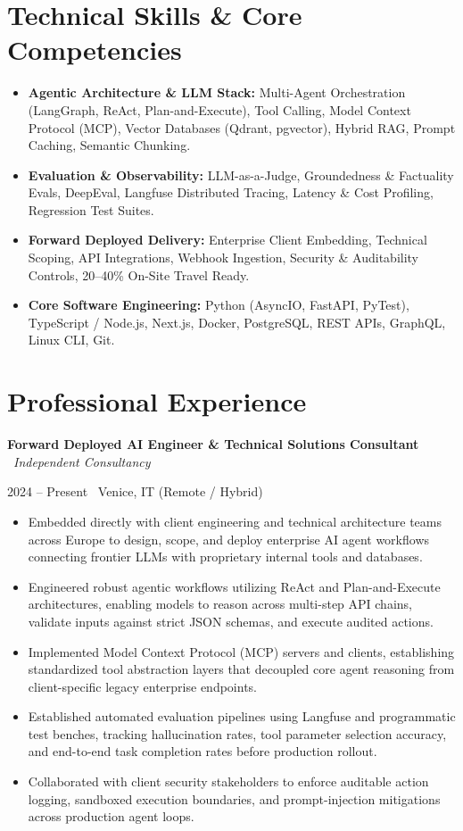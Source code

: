\documentclass[a4paper,10pt]{article}
\newcommand{\role}[4]{%
  \vspace{2pt}\noindent
  \begin{minipage}[t]{0.70\textwidth}\raggedright\textbf{#1} \textbullet\ \textit{#3}\end{minipage}%
  \hfill
  \begin{minipage}[t]{0.28\textwidth}\raggedleft\footnotesize\color{gray}#2 \textbullet\ #4\end{minipage}%
  \vspace{1pt}%
}
\begin{document}
\section{Technical Skills \& Core Competencies}
\begin{itemize}[leftmargin=1.2em, itemsep=2pt]
  \item \textbf{Agentic Architecture \& LLM Stack:} Multi-Agent Orchestration (LangGraph, ReAct, Plan-and-Execute), Tool Calling, Model Context Protocol (MCP), Vector Databases (Qdrant, pgvector), Hybrid RAG, Prompt Caching, Semantic Chunking.
  \item \textbf{Evaluation \& Observability:} LLM-as-a-Judge, Groundedness \& Factuality Evals, DeepEval, Langfuse Distributed Tracing, Latency \& Cost Profiling, Regression Test Suites.
  \item \textbf{Forward Deployed Delivery:} Enterprise Client Embedding, Technical Scoping, API Integrations, Webhook Ingestion, Security \& Auditability Controls, 20--40\% On-Site Travel Ready.
  \item \textbf{Core Software Engineering:} Python (AsyncIO, FastAPI, PyTest), TypeScript / Node.js, Next.js, Docker, PostgreSQL, REST APIs, GraphQL, Linux CLI, Git.
\end{itemize}

\section{Professional Experience}

\role{Forward Deployed AI Engineer \& Technical Solutions Consultant}{2024 -- Present}{Independent Consultancy}{Venice, IT (Remote / Hybrid)}
\begin{itemize}
  \item Embedded directly with client engineering and technical architecture teams across Europe to design, scope, and deploy enterprise AI agent workflows connecting frontier LLMs with proprietary internal tools and databases.
  \item Engineered robust agentic workflows utilizing ReAct and Plan-and-Execute architectures, enabling models to reason across multi-step API chains, validate inputs against strict JSON schemas, and execute audited actions.
  \item Implemented Model Context Protocol (MCP) servers and clients, establishing standardized tool abstraction layers that decoupled core agent reasoning from client-specific legacy enterprise endpoints.
  \item Established automated evaluation pipelines using Langfuse and programmatic test benches, tracking hallucination rates, tool parameter selection accuracy, and end-to-end task completion rates before production rollout.
  \item Collaborated with client security stakeholders to enforce auditable action logging, sandboxed execution boundaries, and prompt-injection mitigations across production agent loops.
\end{itemize}
\end{document}
